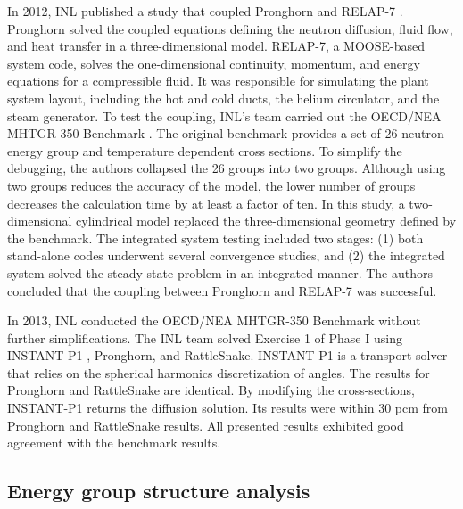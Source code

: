In 2012, \gls{INL} published a study \cite{j_ortensi_initial_2012} that coupled Pronghorn and RELAP-7 \cite{andrs_relap-7_2012}.
Pronghorn solved the coupled equations defining the neutron diffusion, fluid flow, and heat transfer in a three-dimensional model.
RELAP-7, a MOOSE-based system code, solves the one-dimensional continuity, momentum, and energy equations for a compressible fluid.
It was responsible for simulating the plant system layout, including the hot and cold ducts, the helium circulator, and the steam generator.
To test the coupling, INL's team carried out the OECD/NEA MHTGR-350 Benchmark \cite{oecd_nea_coupled_2020}.
The original benchmark provides a set of 26 neutron energy group and temperature dependent cross sections.
To simplify the debugging, the authors collapsed the 26 groups into two groups.
Although using two groups reduces the accuracy of the model, the lower number of groups decreases the calculation time by at least a factor of ten.
In this study, a two-dimensional cylindrical model replaced the three-dimensional geometry defined by the benchmark.
The integrated system testing included two stages: (1) both stand-alone codes underwent several convergence studies, and (2) the integrated system solved the steady-state problem in an integrated manner.
The authors concluded that the coupling between Pronghorn and RELAP-7 was successful.

In 2013, \gls{INL} conducted the OECD/NEA MHTGR-350 Benchmark \cite{strydom_inl_2013} without further simplifications.
The \gls{INL} team solved Exercise 1 of Phase I using INSTANT-P1 \cite{wang_krylov_2011}, Pronghorn, and RattleSnake.
INSTANT-P1 is a transport solver that relies on the spherical harmonics discretization of angles.
The results for Pronghorn and RattleSnake are identical.
By modifying the cross-sections, INSTANT-P1 returns the diffusion solution.
Its results were within 30 pcm from Pronghorn and RattleSnake results.
All presented results exhibited good agreement with the benchmark results.

\subsection{Energy group structure analysis}

